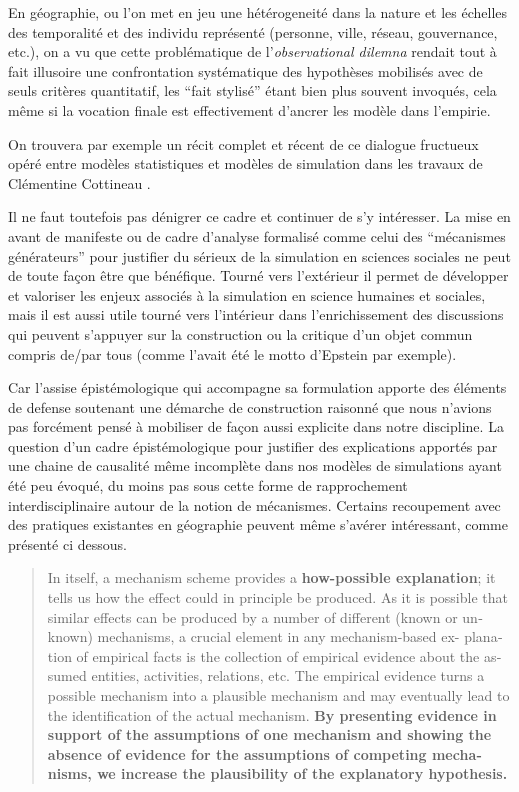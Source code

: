 En géographie, ou l'on met en jeu une hétérogeneité dans la nature et les échelles des temporalité et des individu représenté (personne, ville, réseau, gouvernance, etc.), on a vu que cette problématique de l'\textit{observational dilemna} rendait tout à fait illusoire une confrontation systématique des hypothèses mobilisés avec de seuls critères quantitatif, les \enquote{fait stylisé} étant bien plus souvent invoqués, cela même si la vocation finale est effectivement d'ancrer les modèle dans l'empirie.


On trouvera par exemple un récit complet et récent de ce dialogue fructueux opéré entre modèles statistiques et modèles de simulation dans les travaux de Clémentine Cottineau \autocite{Cottineau2014}.

Il ne faut toutefois pas dénigrer ce cadre et continuer de s'y intéresser. La mise en avant de manifeste \textcite{Conte2012} ou de cadre d'analyse formalisé comme celui des \enquote{mécanismes générateurs} pour justifier du sérieux de la simulation en sciences sociales ne peut de toute façon être que bénéfique. Tourné vers l'extérieur il permet de développer et valoriser les enjeux associés à la simulation en science humaines et sociales, mais il est aussi utile tourné vers l'intérieur dans l'enrichissement des discussions qui peuvent s'appuyer sur la construction ou la critique d'un objet commun compris de/par tous (comme l'avait été le motto d'Epstein par exemple).

Car l'assise épistémologique qui accompagne sa formulation apporte des éléments de defense soutenant une démarche de construction raisonné que nous n'avions pas forcément pensé à mobiliser de façon aussi explicite dans notre discipline. La question d'un cadre épistémologique pour justifier des explications apportés par une chaine de causalité même incomplète dans nos modèles de simulations ayant été peu évoqué, du moins pas sous cette forme de rapprochement interdisciplinaire autour de la notion de mécanismes. Certains recoupement avec des pratiques existantes en géographie peuvent même s'avérer intéressant, comme présenté ci dessous.

\foreignblockquote{english}[\cite{Hedstrom2010}]{In itself, a mechanism scheme provides a \textbf{how-possible explanation}; it tells us how the effect could in principle be produced. As it is possible that similar effects can be produced by a number of different (known or unknown) mechanisms, a crucial element in any mechanism-based ex- planation of empirical facts is the collection of empirical evidence about the assumed entities, activities, relations, etc. The empirical evidence turns a possible mechanism into a plausible mechanism and may eventually lead to the identification of the actual mechanism. \textbf{By presenting evidence in support of the assumptions of one mechanism and showing the absence of evidence for the assumptions of competing mechanisms, we increase the plausibility of the explanatory hypothesis.}} 

